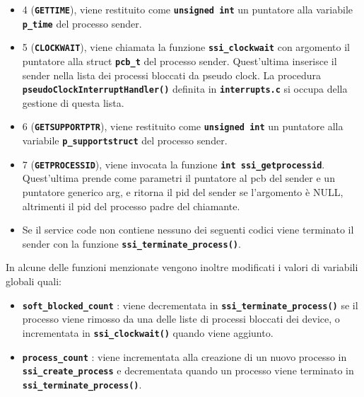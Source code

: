 \documentclass{article}
\begin{document}
\begin{itemize}
		\item 4 (\texttt{\textbf{GETTIME}}), viene restituito come \texttt{\textbf{unsigned
			int}} un puntatore alla variabile \texttt{\textbf{p\_time}} del processo sender.

		\item 5 (\texttt{\textbf{CLOCKWAIT}}), viene chiamata la funzione \texttt{\textbf{ssi\_clockwait}}
			con argomento il puntatore alla struct \texttt{\textbf{pcb\_t}} del processo
			sender. Quest'ultima inserisce il sender nella lista dei processi bloccati
			da pseudo clock. La procedura \texttt{\textbf{pseudoClockInterruptHandler()}}
			definita in \texttt{\textbf{interrupts.c}} si occupa della gestione di questa
			lista.

		\item 6 (\texttt{\textbf{GETSUPPORTPTR}}), viene restituito come \texttt{\textbf{unsigned
			int}} un puntatore alla variabile \texttt{\textbf{p\_supportstruct}} del processo
			sender.

		\item 7 (\texttt{\textbf{GETPROCESSID}}), viene invocata la funzione \texttt{\textbf{int
			ssi\_getprocessid}}. Quest'ultima prende come parametri il puntatore al pcb
			del sender e un puntatore generico arg, e ritorna il pid del sender se l'argomento
			è NULL, altrimenti il pid del processo padre del chiamante.

		\item Se il service code non contiene nessuno dei seguenti codici viene terminato
			il sender con la funzione \texttt{\textbf{ssi\_terminate\_process()}}.
	\end{itemize}

	In alcune delle funzioni menzionate vengono inoltre modificati i valori di variabili
	globali quali:
	\begin{itemize}
		\item \texttt{\textbf{soft\_blocked\_count}} : viene decrementata in \texttt{\textbf{ssi\_terminate\_process()}}
			se il processo viene rimosso da una delle liste di processi bloccati dei device,
			o incrementata in \texttt{\textbf{ssi\_clockwait()}} quando viene aggiunto.

		\item \texttt{\textbf{process\_count}} : viene incrementata alla creazione
			di un nuovo processo in \texttt{\textbf{ssi\_create\_process}} e decrementata
			quando un processo viene terminato in \texttt{\textbf{ssi\_terminate\_process()}}.
	\end{itemize}
\end{document}
